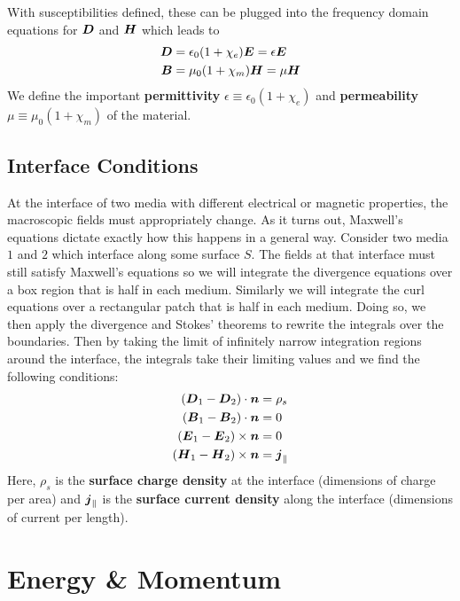 \documentclass[twocolumn]{gwclass}
\begin{document}
	With susceptibilities defined, these can be plugged into the frequency domain equations for $\boldsymbol{D}$
	and $\boldsymbol{H}$ which leads to
	\begin{align*}
		\boldsymbol{D} &= \epsilon_0 (1 +\chi_e)\boldsymbol{E} = \epsilon\boldsymbol{E} \\
		\boldsymbol{B} &= \mu_0(1 +\chi_m)\boldsymbol{H} = \mu\boldsymbol{H}
	\end{align*}	
	We define the important \textbf{permittivity} $\epsilon\equiv\epsilon_0(1 + \chi_e)$ and \textbf{permeability} $\mu\equiv\mu_0(1+\chi_m)$ of the material.
	
	\subsection{Interface Conditions}
	At the interface of two media with different electrical or magnetic properties, the macroscopic fields must appropriately change. As it turns out, Maxwell's equations dictate exactly how this happens in a general way. Consider two media $1$ and $2$ which interface along some surface $S$. The fields at that interface must still satisfy Maxwell's equations so we will integrate the divergence equations over a box region that is half in each medium. Similarly we will integrate the curl equations over a rectangular patch that is half in each medium. Doing so, we then apply the divergence and Stokes' theorems to rewrite the integrals over the boundaries. Then by taking the limit of infinitely narrow integration regions around the interface, the integrals take their limiting values and we find the following conditions:
	\begin{align*} 
		(\boldsymbol{D}_1  - \boldsymbol{D}_2)\cdot\boldsymbol{n} &= \rho_s \\
		(\boldsymbol{B}_1 - \boldsymbol{B}_2)\cdot \boldsymbol{n} &= 0 \\
		(\boldsymbol{E}_1 - \boldsymbol{E}_2)\times \boldsymbol{n} &= 0 \\
		(\boldsymbol{H}_1 - \boldsymbol{H}_2)\times \boldsymbol{n} &= \boldsymbol{j}_\parallel
	\end{align*}
	Here, $\rho_s$ is the \textbf{surface charge density} at the interface (dimensions of charge per area) and $\boldsymbol{j}_\parallel$ is the \textbf{surface current density} along the interface (dimensions of current per length). 
	
	\section{Energy \& Momentum}	
\end{document}
